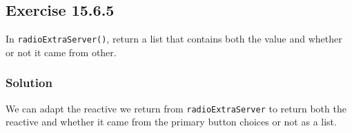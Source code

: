 \documentclass[]{book}
\newenvironment{Shaded}{\begin{snugshade}}{\end{snugshade}}
\newcommand{\ControlFlowTok}[1]{\textcolor[rgb]{0.13,0.29,0.53}{\textbf{#1}}}
\newcommand{\DataTypeTok}[1]{\textcolor[rgb]{0.13,0.29,0.53}{#1}}
\newcommand{\KeywordTok}[1]{\textcolor[rgb]{0.13,0.29,0.53}{\textbf{#1}}}
\newcommand{\NormalTok}[1]{#1}
\newcommand{\OperatorTok}[1]{\textcolor[rgb]{0.81,0.36,0.00}{\textbf{#1}}}
\newcommand{\OtherTok}[1]{\textcolor[rgb]{0.56,0.35,0.01}{#1}}
\newcommand{\StringTok}[1]{\textcolor[rgb]{0.31,0.60,0.02}{#1}}
\begin{document}
\hypertarget{exercise-15.6.5}{%
\subsection*{Exercise 15.6.5}\label{exercise-15.6.5}}

In \texttt{radioExtraServer()}, return a list that contains both the value and whether or not it came from other.

\begin{solution}

\hypertarget{solution-4}{%
\subsubsection*{Solution}\label{solution-4}}

We can adapt the reactive we return from \texttt{radioExtraServer} to return both the reactive and whether it came from the primary button choices or not as a list.

\begin{Shaded}
\end{Shaded}
\end{solution}
\end{document}
